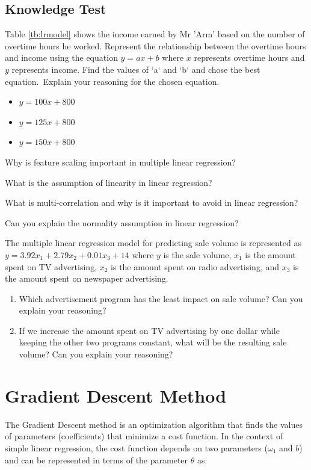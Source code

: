 \newpage
\subsection{Knowledge Test}
\small{
\begin{questions} %
\question Table \ref{tb:lrmodel} shows the income earned by Mr 'Arm' based on the number of overtime hours he worked. Represent the relationship between the overtime hours and income using the equation $y=ax+b$ where $x$ represents overtime hours and $y$ represents income. Find the values of `a` and `b` and chose the best equation. Explain your reasoning for the chosen equation.
\begin{itemize}
  \item $y = 100 x + 800$
  \item $y = 125 x + 800$
  \item $y = 150 x + 800$
\end{itemize}
\question Why is feature scaling important in multiple linear regression?

\question What is the assumption of linearity in linear regression?

\question What is multi-correlation and why is it important to avoid in linear regression?

\question Can you explain the normality assumption in linear regression?

\question The multiple linear regression model for predicting sale volume is represented as $ y = 3.92 x_1 + 2.79 x_2 + 0.01x_3 + 14$ where $y$  is the sale volume, $x_1$  is the amount spent on TV advertising, $x_2$ is the amount spent on radio advertising, and $x_3$ is the amount spent on newspaper advertising.
\begin{enumerate}
  \item Which advertisement program has the least impact on sale volume? Can you explain your reasoning?
  \item If we increase the amount spent on TV advertising by one dollar while keeping the other two programs constant, what will be the resulting sale volume? Can you explain your reasoning?
\end{enumerate}

\end{questions}

\newpage
\section{Gradient Descent Method}\label{sec:GDS}
The Gradient Descent method is an optimization algorithm that finds the values of parameters (coefficients) that minimize a cost function. In the context of simple linear regression, the cost function depends on two parameters ($\omega_1$ and $b$) and can be represented in terms of the parameter $\theta$ as:

}
